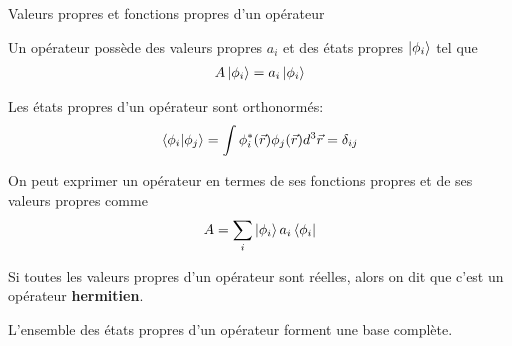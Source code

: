 \documentclass[xcolor=svgnames,t,aspectratio=169,handout]{uqtrcours}
\begin{document}
%
%
%
%
%  
%



\begin{frame}{Valeurs propres et fonctions propres d'un opérateur}

Un opérateur possède des
  valeurs propres $a_i$
  et des états propres $\ket{\phi_i}$
  tel que
\begin{align}
  A \ket{\phi_i} = a_i \ket{\phi_i}
\end{align}

\medskip

Les états propres d'un opérateur sont orthonormés:
\begin{align}
  \braket{\phi_i \vert \phi_j}
  =
  \int \phi_i^*(\vec r) \phi_j (\vec r) d^3 \vec r
  =
  \delta_{ij}
\end{align}

\medskip

On peut exprimer un opérateur
  en termes de ses fonctions propres
  et de ses valeurs propres comme
\begin{align}
  A = \sum_i \ket{\phi_i} a_i \bra{\phi_i}
\end{align}

Si toutes les valeurs propres d'un opérateur sont réelles,
  alors on dit que c'est un opérateur \textbf{hermitien}.

L'ensemble des états propres d'un opérateur forment une base complète.

\end{frame}
\end{document}
